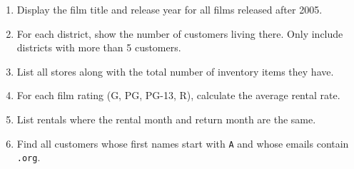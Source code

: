 \documentclass[12pt,a4paper]{article}
\newif\ifshowsolutions
\begin{document}
\begin{enumerate}

\item Display the film title and release year for all films released after 2005.

\ifshowsolutions
\begin{lstlisting}[language=SQL]
SELECT title, release_year
FROM film
WHERE release_year > 2005;
\end{lstlisting}
\fi

\item For each district, show the number of customers living there. Only include districts with more than 5 customers.

\ifshowsolutions
\begin{lstlisting}[language=SQL]
SELECT a.district, COUNT(c.customer_id) AS customer_count
FROM customer c
JOIN address a ON c.address_id = a.address_id
GROUP BY a.district
HAVING COUNT(c.customer_id) > 5;
\end{lstlisting}
\fi

\item List all stores along with the total number of inventory items they have.

\ifshowsolutions
\begin{lstlisting}[language=SQL]
SELECT s.store_id, COUNT(i.inventory_id) AS total_inventory
FROM store s
LEFT JOIN inventory i ON s.store_id = i.store_id
GROUP BY s.store_id;
\end{lstlisting}
\fi

\item For each film rating (G, PG, PG-13, R), calculate the average rental rate.

\ifshowsolutions
\begin{lstlisting}[language=SQL]
SELECT rating, AVG(rental_rate) AS avg_rental_rate
FROM film
WHERE rating IN ('G', 'PG', 'PG-13', 'R')
GROUP BY rating
ORDER BY rating;
\end{lstlisting}
\fi

\item List rentals where the rental month and return month are the same.

\ifshowsolutions
\begin{lstlisting}[language=SQL]
SELECT rental_id, rental_date, return_date
FROM rental
WHERE EXTRACT(MONTH FROM rental_date) =
      EXTRACT(MONTH FROM return_date);
\end{lstlisting}
\fi

\item Find all customers whose first names start with \texttt{A} and whose emails contain \texttt{.org}.


\end{enumerate}
\end{document}
